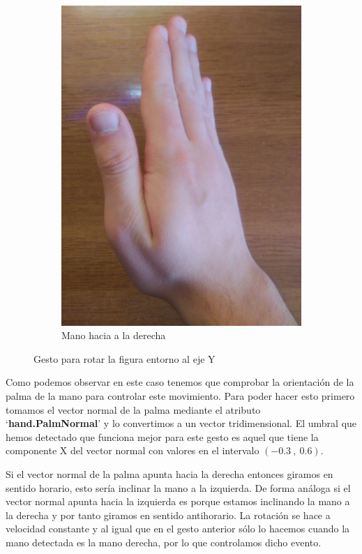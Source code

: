 \documentclass[a4paper,11pt]{article}
\begin{document}
\begin{figure}[!h]
\begin{subfigure}{0.33\textwidth}
		\includegraphics[scale=0.044]{./Imagenes/rota_antihorario.jpg}
		\caption{Mano hacia a la derecha}
	\end{subfigure}
	\caption{Gesto para rotar la figura entorno al eje Y}
	\label{gesto2}
\end{figure}

Como podemos observar en este caso tenemos que comprobar la orientación de la palma de la mano para controlar este movimiento. Para poder hacer esto primero tomamos el vector normal de la palma mediante el atributo `\textbf{hand.PalmNormal}' y lo convertimos a un vector tridimensional. El umbral que hemos detectado que funciona mejor para este gesto es aquel que tiene la componente X del vector normal con valores en el intervalo $(-0.3 \ , \ 0.6)$.

\vspace{10px}

Si el vector normal de la palma apunta hacia la derecha entonces giramos en sentido horario, esto sería inclinar la mano a la izquierda. De forma análoga si el vector normal apunta hacia la izquierda es porque estamos inclinando la mano a la derecha y por tanto giramos en sentido antihorario. La rotación se hace a velocidad constante y al igual que en el gesto anterior sólo lo hacemos cuando la mano detectada es la mano derecha, por lo que controlamos dicho evento.
\end{document}
